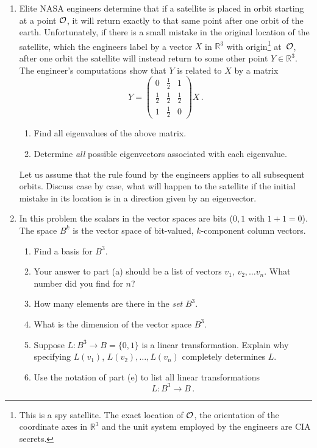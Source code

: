 \begin{enumerate}
\item 
Elite NASA engineers determine that if a satellite is placed in orbit starting at a point ${\cal O}$, it will return
exactly to that same point after one orbit of the earth. Unfortunately, if there is a small mistake in the original location of the 
satellite, which the engineers label by a vector $X$ in ${\mathbb R}^3$ with origin\footnote{This is a spy satellite. The exact location of ${\cal O}$, the orientation of the coordinate axes in ${\mathbb R}^3$ and the unit system employed by the engineers are CIA secrets.} 
at~${\cal O}$, after one orbit the satellite will instead return to some other point $Y\in {\mathbb R}^3$. The engineer's computations
show that $Y$ is related to $X$ by a matrix
\[
Y = \begin{pmatrix} 0&\frac12 & 1 \\[2mm] \frac12 &\frac12 &\frac 12 \\[2mm] 1 & \frac 12 &0\end{pmatrix} X\, .
\]
\begin{enumerate}
\item Find all eigenvalues of the above matrix.
\item Determine  {\itshape all} possible eigenvectors associated with each eigenvalue.
\end{enumerate}
Let us assume that the rule found by the engineers applies to all subsequent orbits. 
Discuss case by case, what will happen to the satellite if the initial mistake in its location
is in a direction given by an eigenvector. 
\item
In this problem the scalars in the vector spaces are bits ($0,1$ with $1+1=0$). The space $B^k$ is the vector space of bit-valued, $k$-component column vectors.
\begin{enumerate}
\item
Find a basis for $B^3$. 
\item Your answer to part (a) should be a list of vectors $v_1$, $v_2,\ldots v_n$. What number did you find for $n$? 
\item How many elements are there in the {\itshape set} $B^3$. 
\item What is the dimension of the vector space $B^3$. 
\item Suppose $L:B^3\to B=\{0,1\}$ is a linear transformation. Explain why specifying $L(v_1)$, $L(v_2),\ldots,L(v_n)$ completely determines $L$. 
\item Use the notation of 
part (e) to list {all} linear transformations \[L:B^3\to B\, .\]

\end{enumerate}
\end{enumerate}
